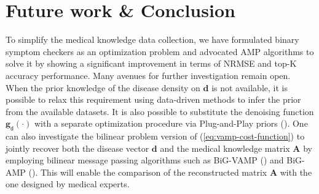 \documentclass[pmlr,twocolumn,10pt]{jmlr} %
\begin{document}
\vspace{-0.5cm}
\section{Future work \& Conclusion}
\vspace{-0.15cm}
To simplify the medical knowledge data collection, we have formulated binary symptom checkers as an optimization problem and advocated AMP algorithms to solve it by showing a significant improvement in terms of NRMSE and top-K accuracy performance. Many avenues for further investigation remain open. When the prior knowledge of the disease density on $\bm{d}$ is not available, it is possible to relax this requirement using data-driven methods to infer the prior from the available datasets. It is also possible to substitute the denoising function $\mathbf{g}_{\bm{\mathsf{d}}}(\cdot)$ with a separate optimization procedure via Plug-and-Play priors (\cite{venkatakrishnan2013plug}). One can also investigate the bilinear problem version of (\ref{eq:vamp-cost-function}) to jointly recover both the disease vector $\mathbf{d}$ and the medical knowledge matrix $\mathbf{A}$ by employing bilinear message passing algorithms such as BiG-VAMP (\cite{akrout2020bilinear}) and BiG-AMP (\cite{parker2014bilinear}). This will enable the comparison of the reconstructed matrix $\mathbf{A}$ with the one designed by medical experts.
\clearpage

\end{document}
